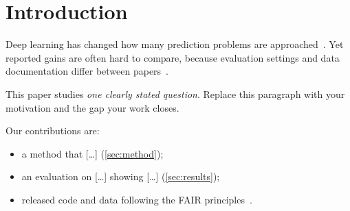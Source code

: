 \section{Introduction}\label{sec:intro}

Deep learning has changed how many prediction problems are approached~\cite{lecun2015deep}.
Yet reported gains are often hard to compare, because evaluation settings and data documentation differ between papers~\cite{gebru2021datasheets,hoefler2015scientific}.

This paper studies \emph{one clearly stated question}.
Replace this paragraph with your motivation and the gap your work closes.

Our contributions are:
\begin{itemize}
  \item a method that [\dots] (\cref{sec:method});
  \item an evaluation on [\dots] showing [\dots] (\cref{sec:results});
  \item released code and data following the FAIR principles~\cite{wilkinson2016fair}.
\end{itemize}

